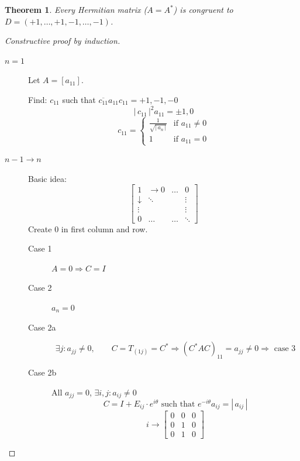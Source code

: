 \documentclass[a4paper,landscape,twocolumn]{article}
\newcommand\abs[1]{|\,#1\,|}
\newtheorem{theorem}{Theorem}
\begin{document}
\begin{theorem}
  \label{theorem-8.24}
  Every Hermitian matrix ($A = A^*$) is congruent to $D = (+1, \ldots, +1,-1, \ldots, -1)$.
\end{theorem}
\begin{proof}[Constructive proof by induction]
  \begin{description}
    \item[$n=1$]
      Let $A = [a_{11}]$.

      Find: $c_{11}$ such that $\overline{c_{11}} a_{11} c_{11} = +1,-1,-0$
      \[ \abs{c_{11}}^2 a_{11} = \pm 1, 0 \]
      \[
        c_{11} = \begin{cases}
          \frac1{\sqrt{\abs{a_n}}} & \text{if } a_{11} \neq 0 \\
          1 & \text{if } a_{11} = 0
        \end{cases}
      \]
    \item[$n-1 \to n$]
      Basic idea:
      \[
        \begin{bmatrix}
          1 & \to 0 & \ldots & 0 \\
          \downarrow & \ddots &  & \vdots \\
          \vdots &  &  & \vdots \\
          0 & \ldots & \ldots & \ddots
        \end{bmatrix}
      \]
      Create $0$ in first column and row.

      \begin{description}
        \item[Case 1]
          $A = 0 \Rightarrow C = I$
        \item[Case 2]
          $a_n = 0$
        \item[Case 2a]
          \[
            \exists j: a_{jj} \neq 0, \qquad C = T_{(1j)} = C^*
            \Rightarrow (C^* A C)_{11}
            = a_{jj} \neq 0
            \Rightarrow \text{ case 3}
          \]
        \item[Case 2b]
          All $a_{jj} = 0$, $\exists i,j: a_{ij} \neq 0$
          \[ C = I + E_{ij} \cdot e^{i\theta} \text{ such that } e^{-i\theta} a_{ij} = \abs{a_{ij}} \]
          \[ i \to \begin{bmatrix} 0 & 0 & 0 \\ 0 & 1 & 0 \\ 0 & 1 & 0 \end{bmatrix} \]


\end{description}
\end{description}
\end{proof}
\end{document}
